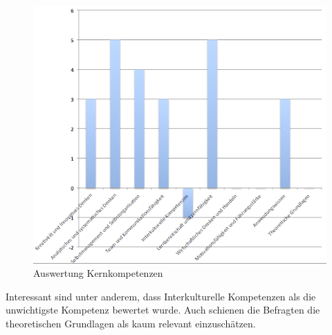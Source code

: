 \begin{figure}[ht]
	\centering
	\includegraphics[width=1.1\textwidth]{images/Auswertung_kernkompetenzen.png}
	\caption{Auswertung Kernkompetenzen}
	\label{fig:auswerkomp}
\end{figure}


Interessant sind unter anderem, dass Interkulturelle Kompetenzen als die unwichtigste Kompetenz bewertet wurde. Auch schienen die Befragten die theoretischen Grundlagen als kaum relevant einzuschätzen.

